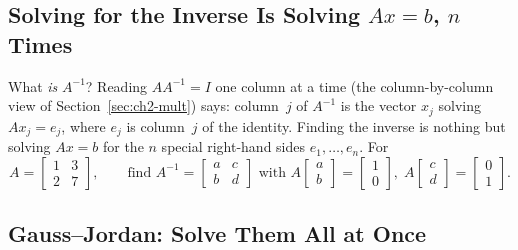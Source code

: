 \subsection{Solving for the Inverse Is Solving $Ax=b$, $n$ Times}

What \emph{is} $A^{-1}$? Reading $AA^{-1}=I$ one column at a time (the column-by-column view of Section~\ref{sec:ch2-mult}) says: column~$j$ of $A^{-1}$ is the vector $x_j$ solving $Ax_j=e_j$, where $e_j$ is column~$j$ of the identity. Finding the inverse is nothing but solving $Ax=b$ for the $n$ special right-hand sides $e_1,\dots,e_n$. For
\[
A=\begin{bmatrix} 1 & 3\\ 2 & 7\end{bmatrix},
\qquad
\text{find } A^{-1}=\begin{bmatrix} a & c\\ b & d\end{bmatrix}
\text{ with } A\begin{bmatrix} a\\ b\end{bmatrix}=\begin{bmatrix}1\\0\end{bmatrix},\;
A\begin{bmatrix} c\\ d\end{bmatrix}=\begin{bmatrix}0\\1\end{bmatrix}.
\]

\subsection{Gauss--Jordan: Solve Them All at Once}

